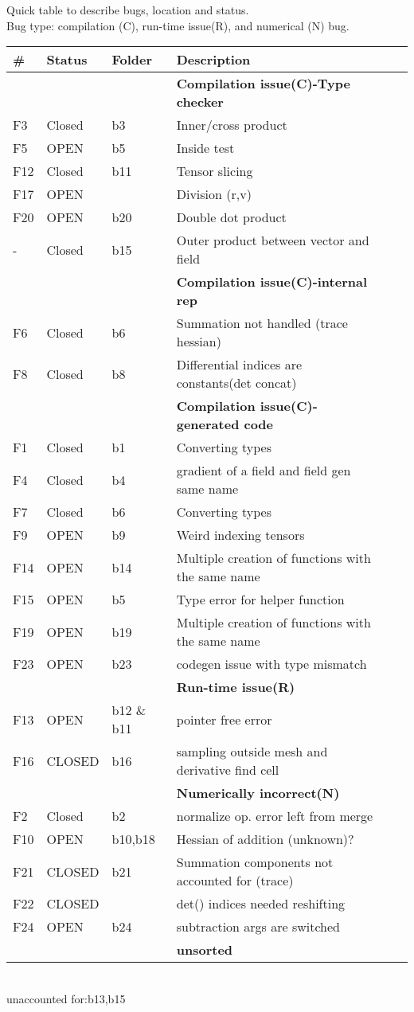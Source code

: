 \documentclass{article}
\begin{document}
Quick table to describe bugs, location and status.\\
Bug type:  compilation (C), run-time issue(R), and numerical (N) bug.\\



\begin{tabular}{|l|ll|lll|}
\hline
\# & Status & Folder & Description \\
\hline
\hline
&&& \textbf{Compilation issue(C)-Type checker}\\
\hline
 F3 &Closed&b3  & Inner/cross product  \\
 F5 &OPEN&b5& Inside test\\
  F12 &Closed & b11 & Tensor slicing\\
F17 &OPEN &   & Division (r,v)\\
  F20 &OPEN & b20  & Double dot product\\
- &  Closed & b15 & Outer product between vector and field \\
  \hline
  \hline
   &&& \textbf{Compilation issue(C)-internal rep}\\
     \hline
   F6 &Closed &b6  & Summation not handled (trace hessian) \\
     F8 &Closed &b8 &Differential indices are constants(det concat)\\
  \hline
  \hline 
 &&& \textbf{Compilation issue(C)-generated code}\\
 \hline
 F1 &Closed& b1& Converting types\\
  F4 &Closed&b4 & gradient of a field and  field gen same name\\
  F7 &Closed& b6  & Converting types\\
F9 &OPEN&b9 & Weird indexing tensors\\
F14 &OPEN & b14 &Multiple creation of functions with the same name\\
 F15 &OPEN&b5 & Type error for helper function\\
 F19 &OPEN & b19 &Multiple creation of functions with the same name\\
  F23  &OPEN& b23& codegen issue with type mismatch\\
   \hline
  \hline
 &&& \textbf{Run-time issue(R)}\\
 \hline
  F13 &OPEN & b12 \& b11  &pointer free error\\
    F16 &CLOSED & b16  & sampling outside mesh and derivative find cell  \\
  \hline
  \hline
 &&& \textbf{Numerically incorrect(N)}\\
 \hline 
  F2 &Closed &b2  & normalize op. error left from merge\\
  F10 &OPEN &b10,b18 &  Hessian of addition (unknown)?\\
   F21  &CLOSED&b21 &Summation components not accounted for (trace)\\
     F22  &CLOSED& & det() indices needed reshifting\\
     F24  &OPEN& b24& subtraction args are switched \\
  \hline
  \hline
 &&& \textbf{unsorted}\\
 \hline
\end{tabular}
\\

unaccounted for:b13,b15




\end{document}
